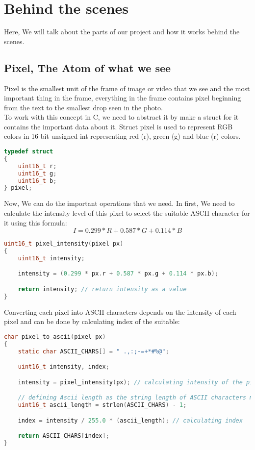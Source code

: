 \documentclass[a4paper,12pt]{article}
\begin{document}
\section{Behind the scenes}
Here, We will talk about the parts of our project and how it works behind the scenes.

\subsection{Pixel, The Atom of what we see}
Pixel is the smallest unit of the frame of image or video that we see and the most important thing in the frame, everything in the frame contains pixel beginning from the text to the smallest drop seen in the photo. \\

To work with this concept in C, we need to abstract it by make a struct for it contains the important data about it. Struct pixel is used to represent RGB colors in 16-bit unsigned int representing red (r), green (g) and blue (r) colors.

\begin{lstlisting}[language=c] 
typedef struct
{
    uint16_t r;
    uint16_t g;
    uint16_t b;
} pixel;
\end{lstlisting}

Now, We can do the important operations that we need. In first, We need to calculate the intensity level of this pixel to select the suitable ASCII character for it using this formula:
$$I = 0.299*R + 0.587*G + 0.114*B$$ 

\begin{lstlisting}[language=c]
uint16_t pixel_intensity(pixel px)
{
    uint16_t intensity;

    intensity = (0.299 * px.r + 0.587 * px.g + 0.114 * px.b);

    return intensity; // return intensity as a value
}
\end{lstlisting}
Converting each pixel into ASCII characters depends on the intensity of each pixel and can be done by calculating index of the suitable:

\begin{lstlisting}[language=c]
char pixel_to_ascii(pixel px)
{
    static char ASCII_CHARS[] = " .,:;-=+*#%@";

    uint16_t intensity, index;

    intensity = pixel_intensity(px); // calculating intensity of the pixel

    // defining Ascii length as the string length of ASCII characters minus 1
    uint16_t ascii_length = strlen(ASCII_CHARS) - 1; 

    index = intensity / 255.0 * (ascii_length); // calculating index

    return ASCII_CHARS[index];
}


\end{lstlisting}
\end{document}
